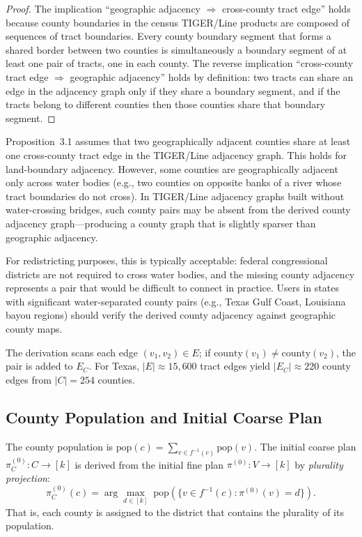 \begin{proof}
The implication ``geographic adjacency $\Rightarrow$ cross-county tract edge''
holds because county boundaries in the census TIGER/Line products are
composed of sequences of tract boundaries.
Every county boundary segment that forms a shared border between two counties
is simultaneously a boundary segment of at least one pair of tracts, one in
each county.
The reverse implication ``cross-county tract edge $\Rightarrow$ geographic
adjacency'' holds by definition: two tracts can share an edge in the
adjacency graph only if they share a boundary segment, and if the tracts
belong to different counties then those counties share that boundary segment.
\end{proof}

\begin{remark}
Proposition~3.1 assumes that two geographically adjacent counties share at least one cross-county tract edge in the TIGER/Line adjacency graph. This holds for land-boundary adjacency. However, some counties are geographically adjacent only across water bodies (e.g., two counties on opposite banks of a river whose tract boundaries do not cross). In TIGER/Line adjacency graphs built without water-crossing bridges, such county pairs may be absent from the derived county adjacency graph---producing a county graph that is slightly sparser than geographic adjacency.

For redistricting purposes, this is typically acceptable: federal congressional districts are not required to cross water bodies, and the missing county adjacency represents a pair that would be difficult to connect in practice. Users in states with significant water-separated county pairs (e.g., Texas Gulf Coast, Louisiana bayou regions) should verify the derived county adjacency against geographic county maps.
\end{remark}

The derivation scans each edge $(v_1, v_2) \in E$; if
$\mathrm{county}(v_1) \neq \mathrm{county}(v_2)$, the pair is added to
$E_C$.
For Texas, $|E| \approx 15{,}600$ tract edges yield $|E_C| \approx 220$
county edges from $|C| = 254$ counties.

\subsection{County Population and Initial Coarse Plan}

The county population is
$\mathrm{pop}(c) = \sum_{v \in f^{-1}(c)} \mathrm{pop}(v)$.
The initial coarse plan $\pi_C^{(0)} : C \to [k]$ is derived from the
initial fine plan $\pi^{(0)} : V \to [k]$ by \emph{plurality projection}:
\[
  \pi_C^{(0)}(c) = \arg\max_{d \in [k]}\;
    \mathrm{pop}\!\left(\{v \in f^{-1}(c) : \pi^{(0)}(v) = d\}\right).
\]
That is, each county is assigned to the district that contains the plurality
of its population.

